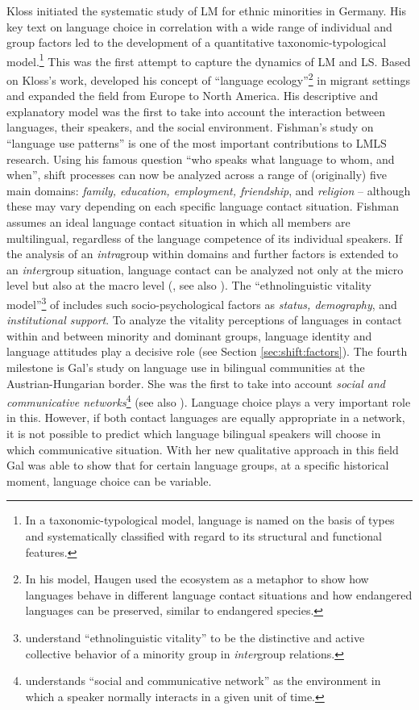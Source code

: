 \documentclass[output=paper]{langscibook}
\begin{document}
Kloss initiated the systematic study of LM for ethnic minorities in Germany. His key text \parencite{Kloss1966} on language choice in correlation with a wide range of individual and group factors led to the development of a quantitative taxonomic-typological model.\footnote{In a taxonomic-typological model, language is named on the basis of types and systematically classified with regard to its structural and functional features.} This was the first attempt to capture the dynamics of LM and LS.
Based on Kloss's work, \textcite{Haugen1972} developed his concept of ``language ecology''\footnote{In his model, Haugen used the ecosystem as a metaphor to show how languages behave in different language contact situations and how endangered languages can be preserved, similar to endangered species.} in migrant settings and expanded the field from Europe to North America. His descriptive and explanatory model was the first to take into account the interaction between languages, their speakers, and the social environment.
Fishman's \parencite*{Fishman1972} study on ``language use patterns'' is one of the most important contributions to LMLS research. Using his famous question ``who speaks what language to whom, and when'', shift processes can now be analyzed across a range of (originally) five main domains: \emph{family, education, employment, friendship}, and \emph{religion} -- although these may vary depending on each specific language contact situation. Fishman assumes an ideal language contact situation in which all members are multilingual, regardless of the language competence of its individual speakers. If the analysis of an \emph{intra}group within domains and further factors is extended to an \emph{inter}group situation, language contact can be analyzed not only at the micro level but also at the macro level (\cite[335--336]{Werlen2004}, see also ).
The ``ethnolinguistic vitality model''\footnote{\textcite[308]{Giles1977} understand ``ethnolinguistic vitality'' to be the distinctive and active collective behavior of a minority group in \emph{inter}group relations.} of \textcite{Giles1977} includes such socio-psychological factors as \emph{status, demography}, and \emph{institutional support}. To analyze the vitality perceptions of languages in contact within and between minority and dominant groups, language identity and language attitudes play a decisive role (see Section \ref{sec:shift:factors}).
The fourth milestone is Gal's \parencite*{Gal1979} study on language use in bilingual communities at the Austrian-Hungarian border. She was the first to take into account \textit{social and communicative networks}\footnote{\textcite{Gal1979} understands ``social and communicative network'' as the environment in which a speaker normally interacts in a given unit of time.} (see also \citealt{Dorian1980}). Language choice plays a very important role in this. However, if both contact languages are equally appropriate in a network, it is not possible to predict which language bilingual speakers will choose in which communicative situation. With her new qualitative approach in this field Gal was able to show that for certain language groups, at a specific historical moment, language choice can be variable.
\end{document}
